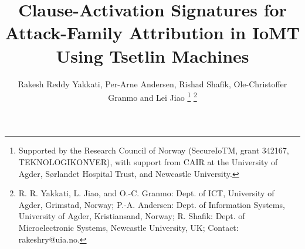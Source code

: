 \documentclass[conference]{IEEEtran}
\begin{document}
\title{Clause-Activation Signatures for Attack-Family Attribution in IoMT Using Tsetlin Machines}

\author{{\small Rakesh Reddy Yakkati, Per-Arne Andersen, Rishad Shafik, Ole-Christoffer Granmo and Lei Jiao}
\thanks{Supported by the Research Council of Norway (SecureIoTM, grant 342167, TEKNOLOGIKONVER), with support from CAIR at the University of Agder, S\o rlandet Hospital Trust, and Newcastle University.}%
\thanks{R. R. Yakkati, L. Jiao, and O.-C. Granmo: Dept. of ICT, University of Agder, Grimstad, Norway; P.-A. Andersen: Dept. of Information Systems, University of Agder, Kristiansand, Norway; R. Shafik: Dept. of Microelectronic Systems, Newcastle University, UK; Contact: rakeshry@uia.no.}}

\maketitle
\end{document}
